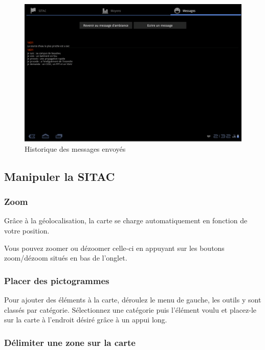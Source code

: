 \documentclass{article}
\begin{document}
\begin{figure}[h!tb]
\begin{center}
\includegraphics[width=487pt]{Manueldutilisation-fig004.png}
\caption{Historique des messages envoyés}
\end{center}
\end{figure}

\subsection{Manipuler la SITAC}


\subsubsection{Zoom}

Grâce à la géolocalisation, la carte se charge automatiquement en fonction de votre position.

Vous pouvez zoomer ou dézoomer celle-ci en appuyant sur les boutons zoom/dézoom situés en bas de l’onglet.

\subsubsection{Placer des pictogrammes}

Pour ajouter des éléments à la carte, déroulez le menu de gauche, les outils y sont classés par catégorie. Sélectionnez une catégorie puis l’élément voulu et placez-le sur la carte à l’endroit désiré grâce à un appui long.


\subsubsection{Délimiter une zone sur la carte}
\end{document}
